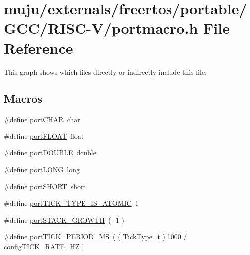 \hypertarget{externals_2freertos_2portable_2_g_c_c_2_r_i_s_c-_v_2portmacro_8h}{}\section{muju/externals/freertos/portable/\+G\+C\+C/\+R\+I\+S\+C-\/\+V/portmacro.h File Reference}
\label{externals_2freertos_2portable_2_g_c_c_2_r_i_s_c-_v_2portmacro_8h}
This graph shows which files directly or indirectly include this file\+:
\subsection*{Macros}
\begin{DoxyCompactItemize}
\item 
\#define \hyperlink{externals_2freertos_2portable_2_g_c_c_2_r_i_s_c-_v_2portmacro_8h_add0bdbfef5abf241c7774f68bde42f1d}{port\+C\+H\+AR}~char
\item 
\#define \hyperlink{externals_2freertos_2portable_2_g_c_c_2_r_i_s_c-_v_2portmacro_8h_a1bbe1ef117ec274ef919e0a930c888ac}{port\+F\+L\+O\+AT}~float
\item 
\#define \hyperlink{externals_2freertos_2portable_2_g_c_c_2_r_i_s_c-_v_2portmacro_8h_a4711ce186a903a14bc8ea7c8650b4f61}{port\+D\+O\+U\+B\+LE}~double
\item 
\#define \hyperlink{externals_2freertos_2portable_2_g_c_c_2_r_i_s_c-_v_2portmacro_8h_a6bbebff6020ac333ab6ec2ffd7f77001}{port\+L\+O\+NG}~long
\item 
\#define \hyperlink{externals_2freertos_2portable_2_g_c_c_2_r_i_s_c-_v_2portmacro_8h_a42e62d5881b12ff2a5c659576c64d003}{port\+S\+H\+O\+RT}~short
\item 
\#define \hyperlink{externals_2freertos_2portable_2_g_c_c_2_r_i_s_c-_v_2portmacro_8h_a62e53bc6d3fa5c4bf4e65ab2752930f3}{port\+T\+I\+C\+K\+\_\+\+T\+Y\+P\+E\+\_\+\+I\+S\+\_\+\+A\+T\+O\+M\+IC}~1
\item 
\#define \hyperlink{externals_2freertos_2portable_2_g_c_c_2_r_i_s_c-_v_2portmacro_8h_a21adaab1601f6a0f35ba550a43060830}{port\+S\+T\+A\+C\+K\+\_\+\+G\+R\+O\+W\+TH}~( -\/1 )
\item 
\#define \hyperlink{externals_2freertos_2portable_2_g_c_c_2_r_i_s_c-_v_2portmacro_8h_a554d9322ce7f698a86a22b21234bd8cd}{port\+T\+I\+C\+K\+\_\+\+P\+E\+R\+I\+O\+D\+\_\+\+MS}~( ( \hyperlink{externals_2freertos_2portable_2_g_c_c_2_a_r_m___c_m0_2portmacro_8h_aa69c48c6e902ce54f70886e6573c92a9}{Tick\+Type\+\_\+t} ) 1000 / \hyperlink{vendor_2ceedling_2plugins_2freertos_2src_2_free_r_t_o_s_config_8h_a2f0258dd1e3b877e5bc013be54c2db6a}{config\+T\+I\+C\+K\+\_\+\+R\+A\+T\+E\+\_\+\+HZ} )

\end{DoxyCompactItemize}
